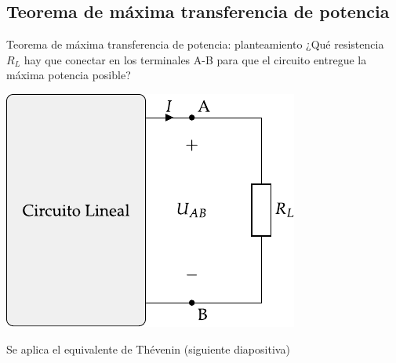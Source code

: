\documentclass[aspectratio=169, xcolor={usenames,svgnames,dvipsnames}]{beamer}
\begin{document}

%
%    


\subsection{Teorema de máxima transferencia de potencia}

\begin{frame}{Teorema de máxima transferencia de potencia: \hspace{4mm}planteamiento}
    ¿Qué resistencia \(R_L\) hay que conectar en los terminales A-B para que el circuito entregue la \alert{máxima potencia posible}?
    
    \begin{center}
        \includegraphics[height=0.55\textheight]{../figs/thevenin_continua_red.pdf}
    \end{center}
    
    Se aplica el \alert{equivalente de Thévenin} (siguiente diapositiva)
\end{frame}

\end{document}
